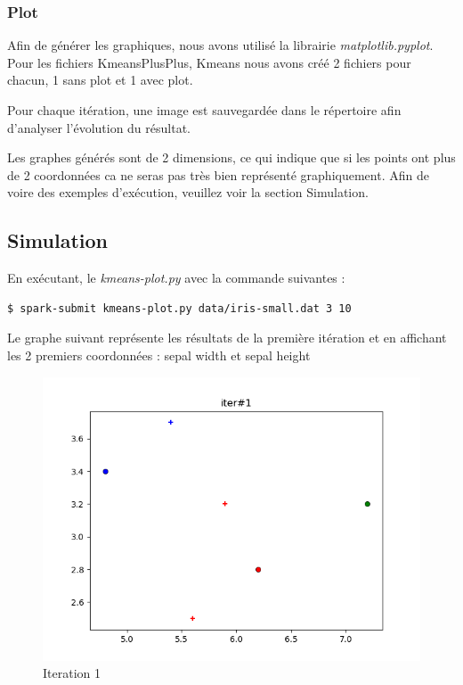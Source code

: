 \documentclass[french]{article}
\begin{document}
\newpage
\subsubsection{Plot}
Afin de générer les graphiques, nous avons utilisé la librairie \textit{matplotlib.pyplot}.\\
Pour les fichiers KmeansPlusPlus, Kmeans nous avons créé 2 fichiers pour chacun, 1 sans plot et 1 avec plot.

Pour chaque itération, une image est sauvegardée dans le répertoire afin d'analyser l'évolution du résultat.

Les graphes générés sont de 2 dimensions, ce qui indique que si les points ont plus de 2 coordonnées ca ne seras pas très bien représenté graphiquement.
Afin de voire des exemples d'exécution, veuillez voir la section Simulation.

\subsection{Simulation}
\noindent En exécutant, le \textit{kmeans-plot.py} avec la commande suivantes :
\begin{lstlisting}[language=bash]
$ spark-submit kmeans-plot.py data/iris-small.dat 3 10
\end{lstlisting}

Le graphe suivant représente les résultats de la première itération et en affichant les 2 premiers coordonnées : sepal width et sepal height
\begin{figure}[h!]
\centering
\includegraphics[width=\linewidth]{img/result-kmeans-1.png}
\caption{Iteration 1}
\end{figure}
\end{document}
